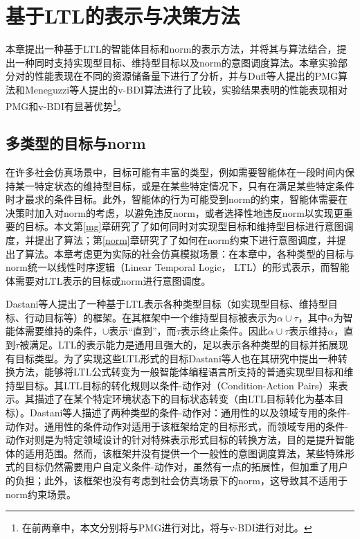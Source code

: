 \chapter{基于LTL的表示与决策方法}\label{ltl}
本章提出一种基于LTL的智能体目标和norm的表示方法，并将其与\SA 算法结合，提出一种同时支持实现型目标、维持型目标以及norm的意图调度算法\SAT。本章实验部分对\SAT 的性能表现在不同的资源储备量下进行了分析，并与Duff等人提出的PMG\cite{DBLP:conf/atal/DuffHT06}算法和Meneguzzi等人提出的v-BDI算法\cite{DBLP:journals/eaai/MeneguzziROVL15}进行了比较，实验结果表明\SAT 的性能表现相对PMG和v-BDI有显著优势\footnote{在前两章中，本文分别将\SAM 与PMG进行对比，将\SAN 与v-BDI进行对比。}。
\section{多类型的目标与norm}
在许多社会仿真场景中，目标可能有丰富的类型，例如需要智能体在一段时间内保持某一特定状态的维持型目标，或是在某些特定情况下，只有在满足某些特定条件时才最求的条件目标。此外，智能体的行为可能受到norm的约束，智能体需要在决策时加入对norm的考虑，以避免违反norm，或者选择性地违反norm以实现更重要的目标。本文第\ref{mg}章研究了了如何同时对实现型目标和维持型目标进行意图调度，并提出了\SAM 算法；第\ref{norm}章研究了了如何在norm约束下进行意图调度，并提出了\SAN 算法。本章考虑更为实际的社会仿真模拟场景：在本章中，各种类型的目标与norm统一以线性时序逻辑（Linear Temporal Logic， LTL）的形式表示，而智能体需要对LTL表示的目标或norm进行意图调度。

Dastani等人\cite{DBLP:conf/atal/DastaniRW11}提出了一种基于LTL表示各种类型目标（如实现型目标、维持型目标、行动目标等）的框架。在其框架中一个维持型目标被表示为$\alpha \cup \tau$，其中$\alpha$为智能体需要维持的条件，$\cup$表示“直到”，而$\tau$表示终止条件。因此$\alpha \cup \tau$表示维持$\alpha$，直到$\tau$被满足。LTL的表示能力是通用且强大的，足以表示各种类型的目标并拓展现有目标类型。为了实现这些LTL形式的目标Dastani等人也在其研究中提出一种转换方法，能够将LTL公式转变为一般智能体编程语言所支持的普通实现型目标和维持型目标。其LTL目标的转化规则以条件-动作对（Condition-Action Pairs）来表示。其描述了在某个特定环境状态下的目标状态转变（由LTL目标转化为基本目标）。Dastani等人\cite{DBLP:conf/atal/DastaniRW11}描述了两种类型的条件-动作对：通用性的以及领域专用的条件-动作对。通用性的条件动作对适用于该框架给定的目标形式，而领域专用的条件-动作对则是为特定领域设计的针对特殊表示形式目标的转换方法，目的是提升智能体的适用范围。然而，该框架并没有提供一个一般性的意图调度算法，某些特殊形式的目标仍然需要用户自定义条件-动作对，虽然有一点的拓展性，但加重了用户的负担；此外，该框架也没有考虑到社会仿真场景下的norm，这导致其不适用于norm约束场景。

